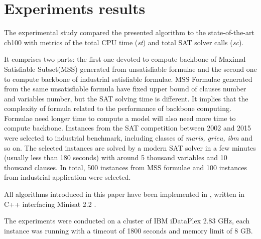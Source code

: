 \section{Experiments results}\label{sec:expr}

The experimental study compared the presented \tool algorithm to the state-of-the-art cb100 with metrics of the total CPU time (\emph{st}) and total SAT solver calls (\emph{sc}).

It comprises two parts: the first one devoted to compute backbone of Maximal Satisfiable Subset(MSS) generated from unsatisfiable formulae and the second one to compute backbone of industrial satisfiable formulae. MSS Formulae generated from the same unsatisfiable formula have fixed upper bound of clauses number and variables number, but the SAT solving time is different. It implies that the complexity of formula related to the performance of backbone computing. Formulae need longer time to compute a model will also need more time to compute backbone.
Instances from the SAT competition between 2002 and 2015 were selected to industrial benchmark, including classes of \emph{maris, grieu, ibm} and so on. The selected instances are solved by a modern SAT solver in a few minutes (usually less than 180 seconds) with around 5 thousand variables and 10 thousand clauses. In total, 500 instances from MSS formulae and 100 instances from industrial application were selected.

All algorithms introduced in this paper have been implemented in \tool, written in C++ interfacing Minisat 2.2 \cite{MINISAT}.

The experiments were conducted on a cluster of IBM iDataPlex 2.83 GHz, each instance was running with a timeout of 1800 seconds and memory limit of 8 GB.



